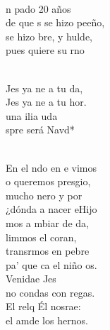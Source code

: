 \documentclass[12pt]{article}
\begin{document}
\begin{multicols*}{2}
\begin{cancion}%
	  \\
	n pado 20 años\\
	de que s se hizo peeño,\\
	se hizo bre, y hulde,\\
	pues  quiere su rno\\\jump\\
	\begin{chorus}%
	Jes ya ne a tu da,\\
	Jes ya ne a tu hor.\\
	una ilia uda \\
	spre será Navd*  \\
	\end{chorus}%
	\jump\\
	En el ndo en e vimos\\
	o queremos presgio,\\
	mucho nero y por\\
	¿dónda a nacer eHijo\\
\jump
	mos a mbiar de da,\\
	limmos el coran, \\
	transrmos en pebre \\
	pa' que ca el niño os.\\
\jump
	 Venidae Jes \\
	no condas con regas.\\
	El relq Él nosrae:\\
	el amde los hernos. \\
\end{cancion}%


\end{multicols*}
\end{document}
